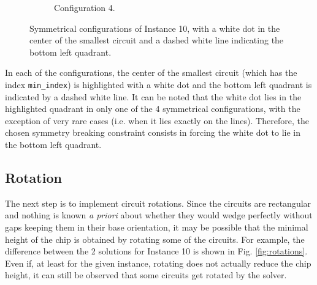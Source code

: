 \documentclass[a4paper, 12pt]{article}
\begin{document}
\begin{figure}
\begin{subfigure}[t]{0.45\textwidth}
        \caption{Configuration 4.}
    \end{subfigure}
    \caption[Symmetrical configurations.]{Symmetrical configurations of Instance 10, with a white dot in the center of the smallest circuit and a dashed white line indicating the bottom left quadrant.}
    \label{fig:solutions}  
\end{figure}

In each of the configurations, the center of the smallest circuit (which has the index \verb|min_index|) is highlighted with a white dot and the bottom left quadrant is indicated by a dashed white line. It can be noted that the white dot lies in the highlighted quadrant in only one of the 4 symmetrical configurations, with the exception of very rare cases (i.e. when it lies exactly on the lines). Therefore, the chosen symmetry breaking constraint consists in forcing the white dot to lie in the bottom left quadrant.

\subsection{Rotation}


The next step is to implement circuit rotations. Since the circuits are rectangular and nothing is known \emph{a priori} about whether they would wedge perfectly without gaps keeping them in their base orientation, it may be possible that the minimal height of the chip is obtained by rotating some of the circuits. For example, the difference between the 2 solutions for Instance 10 is shown in Fig. \ref{fig:rotations}. Even if, at least for the given instance, rotating does not actually reduce the chip height, it can still be observed that some circuits get rotated by the solver.
\end{document}
